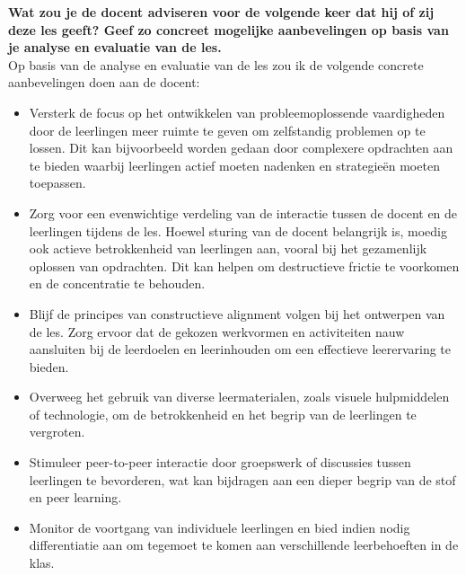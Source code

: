 \documentclass{article}
\begin{document}
                \textbf{Wat zou je de docent adviseren voor de volgende keer dat hij of zij deze les geeft? Geef zo concreet mogelijke aanbevelingen op basis van je analyse en evaluatie van de les.} \\
                
                    Op basis van de analyse en evaluatie van de les zou ik de volgende concrete aanbevelingen doen aan de docent:
                    \begin{itemize}
                        \item Versterk de focus op het ontwikkelen van probleemoplossende vaardigheden door de leerlingen meer ruimte te geven om zelfstandig problemen op te lossen. Dit kan bijvoorbeeld worden gedaan door complexere opdrachten aan te bieden waarbij leerlingen actief moeten nadenken en strategieën moeten toepassen.
                        \item Zorg voor een evenwichtige verdeling van de interactie tussen de docent en de leerlingen tijdens de les. Hoewel sturing van de docent belangrijk is, moedig ook actieve betrokkenheid van leerlingen aan, vooral bij het gezamenlijk oplossen van opdrachten. Dit kan helpen om destructieve frictie te voorkomen en de concentratie te behouden.
                        \item Blijf de principes van constructieve alignment volgen bij het ontwerpen van de les. Zorg ervoor dat de gekozen werkvormen en activiteiten nauw aansluiten bij de leerdoelen en leerinhouden om een effectieve leerervaring te bieden.
                        \item Overweeg het gebruik van diverse leermaterialen, zoals visuele hulpmiddelen of technologie, om de betrokkenheid en het begrip van de leerlingen te vergroten.
                        \item Stimuleer peer-to-peer interactie door groepswerk of discussies tussen leerlingen te bevorderen, wat kan bijdragen aan een dieper begrip van de stof en peer learning.
                        \item Monitor de voortgang van individuele leerlingen en bied indien nodig differentiatie aan om tegemoet te komen aan verschillende leerbehoeften in de klas.
                    \end{itemize}
\end{document}
